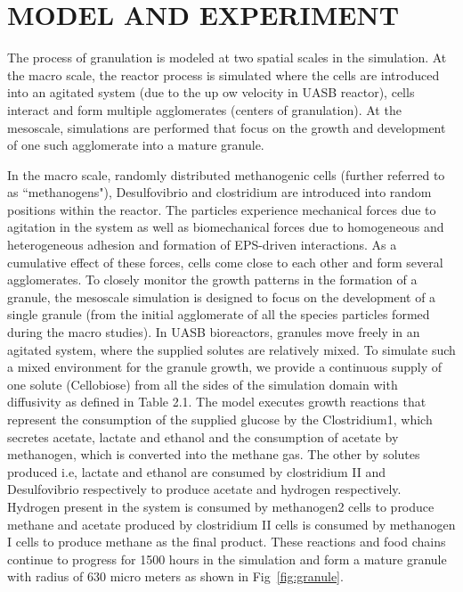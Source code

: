 %
%
%
%

\chapter{MODEL AND EXPERIMENT}

The process of granulation is modeled at two spatial scales in the simulation. At the macro scale, the reactor process is simulated where the cells are introduced into an agitated system (due to the up ow velocity in UASB reactor), cells interact and form multiple agglomerates (centers of granulation). At the mesoscale, simulations are performed that focus on the growth and development of one such agglomerate into a mature granule.

In the macro scale, randomly distributed methanogenic cells (further referred to as “methanogens"), Desulfovibrio and clostridium are introduced into random positions within the reactor. The particles experience mechanical forces due to agitation in the system as well as biomechanical forces due to homogeneous and heterogeneous adhesion and formation of EPS-driven interactions. As a cumulative effect of these forces, cells come close to each other and form several agglomerates.
To closely monitor the growth patterns in the formation of a granule, the mesoscale simulation is designed to focus on the development of a single granule (from the initial agglomerate of all the species particles formed during the macro studies). In UASB bioreactors, granules move freely in an agitated system, where the supplied solutes are relatively mixed. To simulate such a mixed environment for the granule growth, we provide a continuous supply of one solute (Cellobiose) from all the sides of the simulation domain with diffusivity as defined in Table 2.1. The model executes growth reactions that represent the consumption of the supplied glucose by the Clostridium1, which secretes acetate, lactate and ethanol and the consumption of acetate by methanogen, which is converted into the methane gas. The other by solutes produced i.e, lactate and ethanol are consumed by clostridium II and Desulfovibrio respectively to produce acetate and hydrogen respectively. Hydrogen present in the system is consumed by methanogen2 cells to produce methane and acetate produced by clostridium II cells is consumed by methanogen I cells to produce methane as the final product. These reactions and food chains continue to progress for 1500 hours in the simulation and form a mature granule with radius of 630 micro meters as shown in Fig~\ref{fig:granule}.

